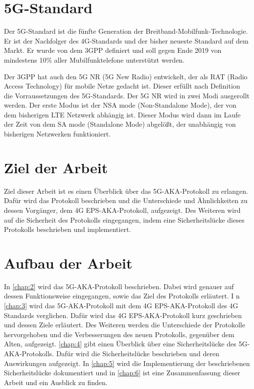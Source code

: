 \section{5G-Standard}
Der 5G-Standard ist die f\"unfte Generation der Breitband-Mobilfunk-Technologie. %
Er ist der Nachfolger des 4G-Standards und der bisher neueste Standard auf dem Markt.
Er wurde von dem 3GPP definiert und soll gegen Ende 2019 von mindestens 10\% aller Mubilfunktelefone unterst\"utzt werden. %

Der 3GPP hat auch den 5G NR (5G New Radio) entwickelt, der als RAT (Radio Access Technology) f\"ur mobile Netze gedacht ist. %
Dieser erf\"ullt nach Definition die Vorraussetzungen des 5G-Standards. %
Der 5G NR wird in zwei Modi ausgerollt werden. 
Der erste Modus ist der NSA mode (Non-Standalone Mode), der von dem bisherigen LTE Netzwerk abh\"angig ist. %
Dieser Modus wird dann im Laufe der Zeit von dem SA mode (Standalone Mode) abgel\"o{\ss}t, der unabh\"angig von bisherigen Netzwerken funktioniert. %


\section{Ziel der Arbeit}
Ziel dieser Arbeit ist es einen \"Uberblick \"uber das 5G-AKA-Protokoll zu erlangen. Daf\"ur wird das Protokoll beschrieben und die Unterschiede und \"Ahnlichkeiten zu dessen Vorg\"anger, dem 4G EPS-AKA-Protokoll, aufgezeigt. Des Weiteren wird auf die Sicherheit des Protokolls eingegangen, indem eine Sicherheitsl\"ucke dieses Protokolls beschrieben und implementiert. %


\section{Aufbau der Arbeit}
In \cref{chap:2} wird das 5G-AKA-Protokoll beschrieben. 
Dabei wird genauer auf dessen Funktionsweise eingegangen, sowie das Ziel des Protokolls erl\"autert. I
n \cref{chap:3} wird das 5G-AKA-Protokoll mit dem 4G EPS-AKA-Protokoll des 4G Standards verglichen. 
Daf\"ur wird das 4G EPS-AKA-Protokoll kurz geschrieben und dessen Ziele erl\"autert. 
Des Weiteren werden die Unterschiede der Protokolle hervorgehoben und die Verbesserungen des neuen Protokolls, gegen\"uber dem Alten, aufgezeigt.
\cref{chap:4} gibt einen \"Uberblick \"uber eine Sicherheitsl\"ucke des 5G-AKA-Protokolls. 
Daf\"ur wird die Sicherheitsl\"ucke beschrieben und deren Auswirkungen aufgezeigt. 
In \cref{chap:5} wird die Implementierung der beschriebenen Sicherheitsl\"ucke dokumentiert und in \cref{chap:6} ist eine Zusammenfassung dieser Arbeit und ein Ausblick zu finden.
